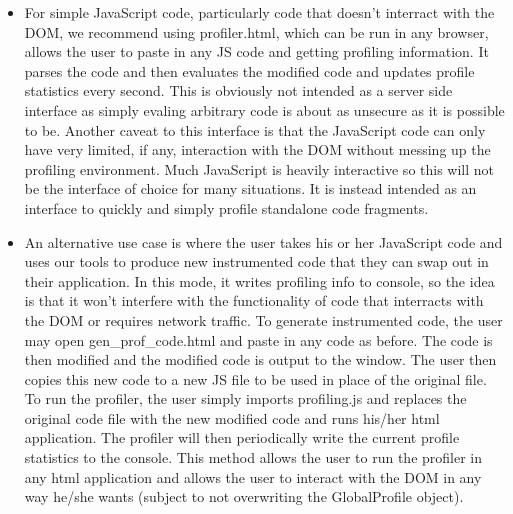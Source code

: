 \documentclass[11pt]{article}
\begin{document}
\begin{itemize}
\item For simple JavaScript code, particularly code that doesn't
  interract with the DOM, we recommend using  profiler.html, which can
  be run in any browser, allows the user to paste in any JS code and
  getting profiling information. It parses the code and then evaluates the modified code and updates profile statistics every second. 
This is obviously not intended as a server side interface as simply evaling arbitrary code is 
about as unsecure as it is possible to be. Another caveat to this interface is that the JavaScript 
code can only have very limited, if any, interaction with the DOM without messing up the profiling 
environment. Much JavaScript is heavily interactive so this will not be the interface of choice 
for many situations. It is instead intended as an interface to quickly and simply profile standalone 
code fragments.

\item  An alternative use case is where the user takes his or her
  JavaScript code and uses our tools to produce new instrumented code
  that they can swap out in their application. In this mode, it writes
  profiling info to console, so the idea is that it won't interfere
  with the functionality of code that interracts with the DOM or
  requires network traffic. To generate instrumented code, the user may 
open gen\_prof\_code.html and paste in any code as before. The code is then modified and 
the modified code is output to the window. The user then copies this new code to a new JS file 
to be used in place of the original file. To run the profiler, the user simply imports profiling.js
and replaces the original code file with the new modified code and
runs his/her html application. The profiler will then periodically write the current profile statistics to the console.
This method allows the user to run the profiler in any html application 
and allows the user to interact with the DOM in any way he/she wants (subject to not overwriting the 
GlobalProfile object).
\end{itemize}
\end{document}

